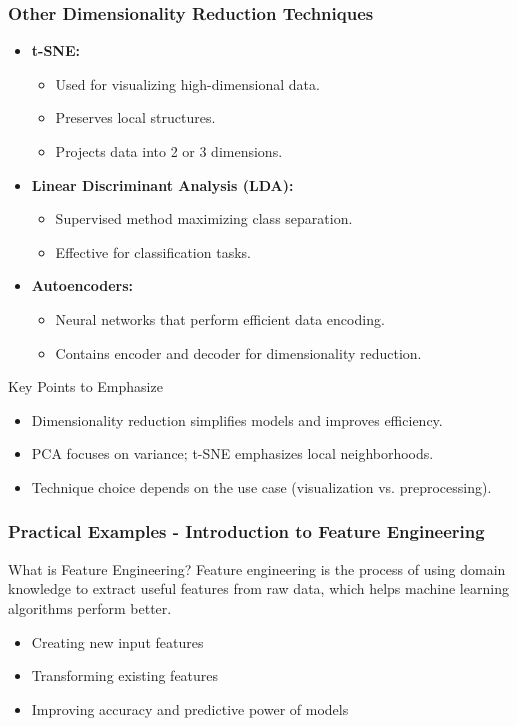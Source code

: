 \documentclass[aspectratio=169]{beamer}
\begin{document}
\begin{frame}[fragile]
    \frametitle{Other Dimensionality Reduction Techniques}
    \begin{itemize}
        \item \textbf{t-SNE:}
        \begin{itemize}
            \item Used for visualizing high-dimensional data.
            \item Preserves local structures.
            \item Projects data into 2 or 3 dimensions.
        \end{itemize}
        
        \item \textbf{Linear Discriminant Analysis (LDA):}
        \begin{itemize}
            \item Supervised method maximizing class separation.
            \item Effective for classification tasks.
        \end{itemize}
        
        \item \textbf{Autoencoders:}
        \begin{itemize}
            \item Neural networks that perform efficient data encoding.
            \item Contains encoder and decoder for dimensionality reduction.
        \end{itemize}
    \end{itemize}
    
    \begin{block}{Key Points to Emphasize}
        \begin{itemize}
            \item Dimensionality reduction simplifies models and improves efficiency.
            \item PCA focuses on variance; t-SNE emphasizes local neighborhoods.
            \item Technique choice depends on the use case (visualization vs. preprocessing).
        \end{itemize}
    \end{block}
\end{frame}

\begin{frame}[fragile]
  \frametitle{Practical Examples - Introduction to Feature Engineering}
  \begin{block}{What is Feature Engineering?}
    Feature engineering is the process of using domain knowledge to extract useful features from raw data, which helps machine learning algorithms perform better. 
  \end{block}
  \begin{itemize}
    \item Creating new input features
    \item Transforming existing features
    \item Improving accuracy and predictive power of models
  \end{itemize}
\end{frame}
\end{document}
